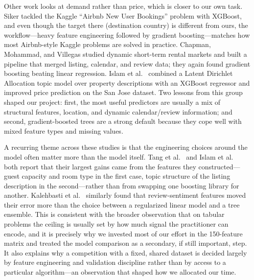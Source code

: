 \documentclass[journal]{IEEEtran}
\begin{document}
Other work looks at demand rather than price, which is closer to our own task.
Siker \cite{siker2018} tackled the Kaggle ``Airbnb New User Bookings'' problem
with XGBoost, and even though the target there (destination country) is
different from ours, the workflow---heavy feature engineering followed by
gradient boosting---matches how most Airbnb-style Kaggle problems are solved in
practice. Chapman, Mohammad, and Villegas \cite{chapman2023} studied dynamic
short-term rental markets and built a pipeline that merged listing, calendar,
and review data; they again found gradient boosting beating linear regression.
Islam et al.\ \cite{islam2022} combined a Latent Dirichlet Allocation topic
model over property descriptions with an XGBoost regressor and improved price
prediction on the San Jose dataset. Two lessons from this group shaped our
project: first, the most useful predictors are usually a mix of structural
features, location, and dynamic calendar/review information; and second,
gradient-boosted trees are a strong default because they cope well with mixed
feature types and missing values.

A recurring theme across these studies is that the engineering choices around the
model often matter more than the model itself. Tang et al.\ \cite{tang2024} and
Islam et al.\ \cite{islam2022} both report that their largest gains came from the
features they constructed---guest capacity and room type in the first case, topic
structure of the listing description in the second---rather than from swapping one
boosting library for another. Kalehbasti et al.\ \cite{kalehbasti2019} similarly
found that review-sentiment features moved their error more than the choice
between a regularized linear model and a tree ensemble. This is consistent with
the broader observation that on tabular problems the ceiling is usually set by how
much signal the practitioner can encode, and it is precisely why we invested most
of our effort in the 150-feature matrix and treated the model comparison as a
secondary, if still important, step. It also explains why a competition with a
fixed, shared dataset is decided largely by feature engineering and validation
discipline rather than by access to a particular algorithm---an observation that
shaped how we allocated our time.
\end{document}
